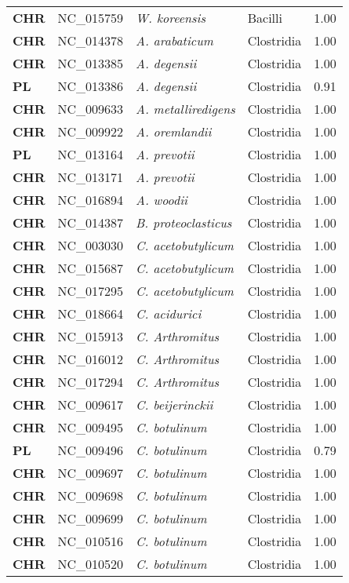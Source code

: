 \begin{adjustwidth}{-3cm}{2cm}
{\begin{supertabular}{>{\bfseries}l|p{0.1\textwidth}p{0.14\textwidth}l|l}
CHR & NC\_015759 & \textit{W. koreensis} & Bacilli & 1.00\\
CHR & NC\_014378 & \textit{A. arabaticum} & Clostridia & 1.00\\
CHR & NC\_013385 & \textit{A. degensii} & Clostridia & 1.00\\
PL & NC\_013386 & \textit{A. degensii} & Clostridia & 0.91\\
CHR & NC\_009633 & \textit{A. metalliredigens} & Clostridia & 1.00\\
CHR & NC\_009922 & \textit{A. oremlandii} & Clostridia & 1.00\\
PL & NC\_013164 & \textit{A. prevotii} & Clostridia & 1.00\\
CHR & NC\_013171 & \textit{A. prevotii} & Clostridia & 1.00\\
CHR & NC\_016894 & \textit{A. woodii} & Clostridia & 1.00\\
CHR & NC\_014387 & \textit{B. proteoclasticus} & Clostridia & 1.00\\
CHR & NC\_003030 & \textit{C. acetobutylicum} & Clostridia & 1.00\\
CHR & NC\_015687 & \textit{C. acetobutylicum} & Clostridia & 1.00\\
CHR & NC\_017295 & \textit{C. acetobutylicum} & Clostridia & 1.00\\
CHR & NC\_018664 & \textit{C. acidurici} & Clostridia & 1.00\\
CHR & NC\_015913 & \textit{C. Arthromitus} & Clostridia & 1.00\\
CHR & NC\_016012 & \textit{C. Arthromitus} & Clostridia & 1.00\\
CHR & NC\_017294 & \textit{C. Arthromitus} & Clostridia & 1.00\\
CHR & NC\_009617 & \textit{C. beijerinckii} & Clostridia & 1.00\\
CHR & NC\_009495 & \textit{C. botulinum} & Clostridia & 1.00\\
PL & NC\_009496 & \textit{C. botulinum} & Clostridia & 0.79\\
CHR & NC\_009697 & \textit{C. botulinum} & Clostridia & 1.00\\
CHR & NC\_009698 & \textit{C. botulinum} & Clostridia & 1.00\\
CHR & NC\_009699 & \textit{C. botulinum} & Clostridia & 1.00\\
CHR & NC\_010516 & \textit{C. botulinum} & Clostridia & 1.00\\
CHR & NC\_010520 & \textit{C. botulinum} & Clostridia & 1.00\\

\end{supertabular}}
\end{adjustwidth}
